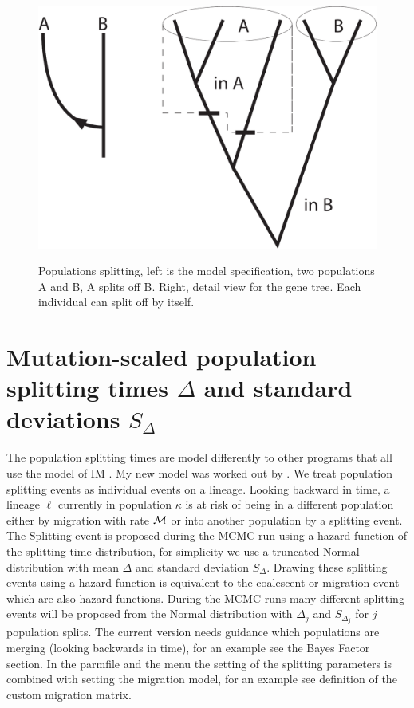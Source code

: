 \begin{figure}[tbh]
\begin{center}
\leavevmode
\hbox{%
\includegraphics[scale=0.4]{mim/species_manual}}
\end{center}

\caption{Populations splitting, left is the model specification, two populations A and B, A splits off B. Right, detail view for the gene tree. Each individual can split off by itself.}
\label{FIG2}
\end{figure}

\section*{Mutation-scaled population splitting  times $\Delta$ and standard deviations $S_\Delta$}
The population splitting times are model differently to other programs that all use the model of IM \citep{Hey:2010a}.
My new model was worked out by \cite{Palczewski2015}.  We treat population splitting events as individual events on a lineage. Looking backward in time, a lineage $\ell$  currently in population $\kappa$ is at risk of being  in a different population either by migration with rate $\mathcal{M}$ or into another population by a splitting event. The Splitting event is proposed during the MCMC run using a hazard function of the splitting time distribution, for simplicity we use a truncated Normal distribution with mean $\Delta$ and standard deviation $S_\Delta$. Drawing these splitting events using a hazard function is equivalent to the coalescent or migration event which are also hazard functions. During the MCMC runs many different splitting events will be proposed from the Normal distribution with $\Delta_j$ and $S_{\Delta_j}$ for $j$ population splits. The current version needs guidance which populations are merging (looking backwards in time), for an example see the Bayes Factor section.  In the parmfile and the menu the setting of the splitting parameters is combined with setting the migration model, for an example see definition of the custom migration matrix.  


